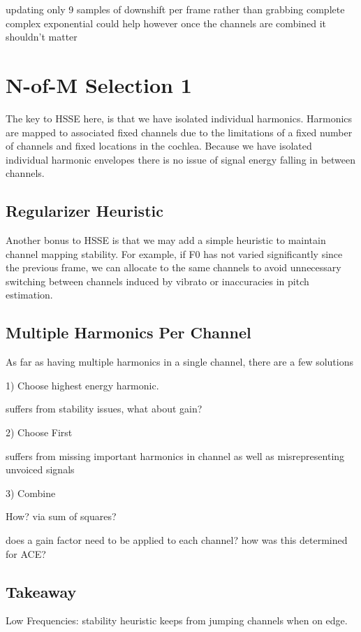 \documentclass [11pt, proquest] {uwthesis}[2015/03/03]
\begin{document}
updating only 9 samples of downshift per frame rather than grabbing complete complex exponential could help however once the channels are combined it shouldn't matter

\section{N-of-M Selection 1}

The key to HSSE here, is that we have isolated individual harmonics.  Harmonics are mapped to associated fixed channels due to the limitations of a fixed number of channels and fixed locations in the cochlea.  Because we have isolated individual harmonic envelopes there is no issue of signal energy falling in between channels.

\subsection{Regularizer Heuristic}

Another bonus to HSSE is that we may add a simple heuristic to maintain channel mapping stability.  For example, if F0 has not varied significantly since the previous frame, we can allocate to the same channels to avoid unnecessary switching between channels induced by vibrato or inaccuracies in pitch estimation.

\subsection{Multiple Harmonics Per Channel}
As far as having multiple harmonics in a single channel, there are a few solutions

1) Choose highest energy harmonic.

suffers from stability issues, what about gain?

2) Choose First

suffers from missing important harmonics in channel as well as misrepresenting unvoiced signals

3) Combine

How?  via sum of squares?

does a gain factor need to be applied to each channel?  how was this determined for ACE?

\subsection{Takeaway}

Low Frequencies: stability heuristic keeps from jumping channels when on edge.
\end{document}
